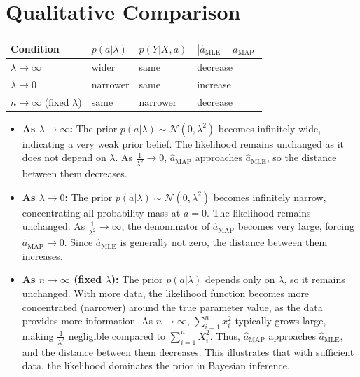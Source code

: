 \documentclass[11pt, a4paper, oneside]{memoir}
\begin{document}
\section{Qualitative Comparison}
\begin{table}[htbp]
  \centering
  \begin{tabular}{|p{}|p{}|p{}|p{}|}
    \hline
    \textbf{Condition} & \textbf{$p(a | \lambda)$} & \textbf{$p(Y | X, a)$} & \textbf{$|\hat{a}_{\text{MLE}} - \hat{a}_{\text{MAP}}|$} \\
    \hline
    $\lambda \rightarrow \infty$ & wider & same & decrease \\
    $\lambda \rightarrow 0$ & narrower & same & increase \\
    $n \rightarrow \infty$ (fixed $\lambda$) & same & narrower & decrease \\
    \hline
  \end{tabular}
\end{table}
\begin{itemize}
    \item \textbf{As $\lambda \rightarrow \infty$:}
    The prior $p(a | \lambda) \sim \mathcal{N}(0, \lambda^2)$ becomes infinitely wide, indicating a very weak prior belief.
    The likelihood remains unchanged as it does not depend on $\lambda$.
    As $\frac{1}{\lambda^2} \rightarrow 0$, $\hat{a}_{\text{MAP}}$ approaches $\hat{a}_{\text{MLE}}$, so the distance between them decreases.
    \item \textbf{As $\lambda \rightarrow 0$:}
    The prior $p(a | \lambda) \sim \mathcal{N}(0, \lambda^2)$ becomes infinitely narrow, concentrating all probability mass at $a=0$.
    The likelihood remains unchanged. As $\frac{1}{\lambda^2} \rightarrow \infty$,
    the denominator of $\hat{a}_{\text{MAP}}$ becomes very large, forcing $\hat{a}_{\text{MAP}} \rightarrow 0$.
    Since $\hat{a}_{\text{MLE}}$ is generally not zero, the distance between them increases.
    \item \textbf{As $n \rightarrow \infty$ (fixed $\lambda$):}
    The prior $p(a | \lambda)$ depends only on $\lambda$, so it remains unchanged.
    With more data, the likelihood function becomes more concentrated (narrower) around the true parameter value, as the data provides more information.
    As $n \rightarrow \infty$, $\sum_{i=1}^n x_i^2$ typically grows large, making $\frac{1}{\lambda^2}$ negligible compared to $\sum_{i=1}^n X_i^2$.
    Thus, $\hat{a}_{\text{MAP}}$ approaches $\hat{a}_{\text{MLE}}$, and the distance between them decreases. This illustrates that with sufficient data,
    the likelihood dominates the prior in Bayesian inference.
\end{itemize}
\end{document}

